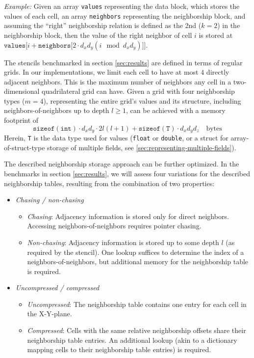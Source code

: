 \textit{Example:} Given an array \texttt{values} representing the data block, which stores the values of each cell, an array \texttt{neighbors} representing the neighborship block, and assuming the ``right'' neighborship relation is defined as the 2nd ($k=2$) in the neighborship block, then the value of the right neighbor of cell $i$ is stored at $\mathtt{values[}i + \mathtt{neighbors[}2\cdot d_xd_y(i \mod d_xd_y)\mathtt{]]}$.

The stencils benchmarked in section \ref{sec:results} are defined in terms of regular grids. In our implementations, we limit each cell to have at most $4$ directly adjacent neighbors. This is the maximum number of neighbors any cell in a two-dimensional quadrilateral grid can have. Given a grid with four neighborship types ($m=4$), representing the entire grid's values and its structure, including neighbors-of-neighbors up to depth $l \geq 1$, can be achieved with a memory footprint of 
$$\mathtt{sizeof(int)} \cdot d_xd_y \cdot 2 l(l+1) + \mathtt{sizeof(T)}\cdot d_xd_yd_z \quad \text{bytes}$$
Herein, \texttt{T} is the data type used for values (\texttt{float} or \texttt{double}, or a struct for array-of-struct-type storage of multiple fields, see \ref{sec:representing-multiple-fields}).

The described neighborship storage approach can be further optimized. In the  benchmarks in section \ref{sec:results}, we will assess four variations for the described neighborship tables, resulting from the combination of two properties:

\begin{itemize}
    \item \emph{Chasing / non-chasing}
    \begin{itemize}
        \item \emph{Chasing}: Adjacency information is stored only for direct neighbors. Accessing neighbors-of-neighbors requires pointer chasing.
        \item \emph{Non-chasing}: Adjacency information is stored up to some depth $l$ (as required by the stencil). One lookup suffices to determine the index of a neighbors-of-neighbors, but additional memory for the neighborship table is required.
    \end{itemize}
    \item \emph{Uncompressed / compressed}
    \begin{itemize}
        \item \emph{Uncompressed}: The neighborship table contains one entry for each cell in the X-Y-plane.
        \item \emph{Compressed}: Cells with the same relative neighborship offsets share their neighborship table entries. An additional lookup (akin to a dictionary mapping cells to their neighborship table entries) is required.
    \end{itemize}
\end{itemize}

